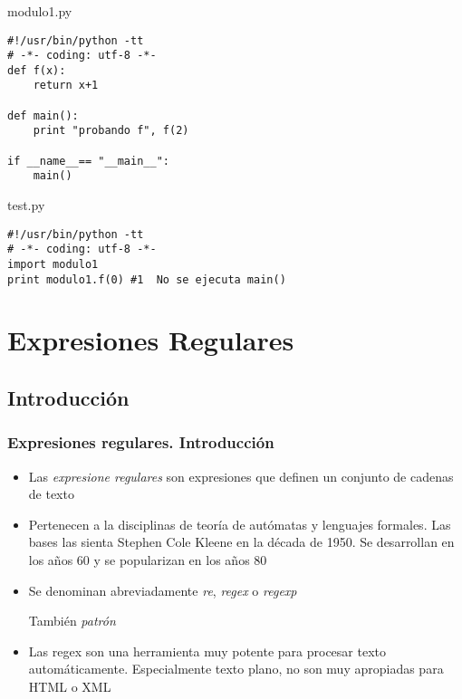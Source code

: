 \documentclass[ucs]{beamer}
\begin{document}
\begin{frame}[fragile]
\frametitle{}

  \begin{footnotesize}
  \begin{center}
modulo1.py
  \end{center}
  \begin{verbatim}
#!/usr/bin/python -tt
# -*- coding: utf-8 -*-
def f(x):
    return x+1

def main():
    print "probando f", f(2)

if __name__== "__main__":
    main()
  \end{verbatim}
  \end{footnotesize}
  \begin{footnotesize}
  \begin{center}
test.py
  \end{center}
  \begin{verbatim}
#!/usr/bin/python -tt
# -*- coding: utf-8 -*-
import modulo1
print modulo1.f(0) #1  No se ejecuta main()
  \end{verbatim}
  \end{footnotesize}

\end{frame}



\section{Expresiones Regulares}


\subsection{Introducción}

\begin{frame}[fragile]
\frametitle{Expresiones regulares. Introducción}
\begin{itemize}
\item
Las \emph{expresione regulares} son expresiones que definen
un conjunto de cadenas de texto

\item
Pertenecen a la disciplinas de 
teoría de autómatas y lenguajes formales. Las bases
las sienta Stephen Cole Kleene en la década de 1950. Se 
desarrollan en los años 60 y se popularizan en los años 80

\item
Se denominan abreviadamente 
\emph{re},
\emph{regex} o
\emph{regexp} 

También \emph{patrón}

\item
Las regex son una herramienta muy potente para procesar
texto automáticamente. Especialmente texto plano, no
son muy apropiadas para HTML o XML

\end{itemize}
\end{frame}
\end{document}
